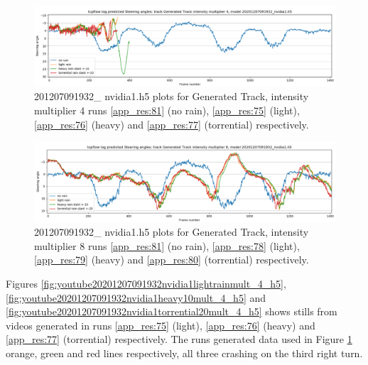 \begin{figure}[h!]
 \centering 
 \includegraphics[width=\textwidth]{Figures/sa_GeneratedTrackintensitymultiplier4_20201207091932_nvidia1.h5.png}
 \caption{201207091932\_ nvidia1.h5 plots for Generated Track, intensity multiplier 4 runs \ref{app_res:81} (no rain),  \ref{app_res:75} (light), \ref{app_res:76} (heavy) and \ref{app_res:77} (torrential) respectively.}
 \label{fig:sa_GeneratedTrackintensitymultiplier4_20201207091932_nvidia1} 
\end{figure}

\begin{figure}[h!]
 \centering 
 \includegraphics[width=\textwidth]{Figures/sa_GeneratedTrackintensitymultiplier8_20201207091932_nvidia1.h5.png}
 \caption{201207091932\_ nvidia1.h5 plots for Generated Track, intensity multiplier 8 runs \ref{app_res:81} (no rain),  \ref{app_res:78} (light), \ref{app_res:79} (heavy) and \ref{app_res:80} (torrential) respectively.}
 \label{fig:sa_GeneratedTrackintensitymultiplier8_20201207091932_nvidia1} 
\end{figure}


Figures \ref{fig:youtube20201207091932nvidia1lightrainmult_4_h5}, \ref{fig:youtube20201207091932nvidia1heavy10mult_4_h5} and  \ref{fig:youtube20201207091932nvidia1torrential20mult_4_h5} shows stills from videos generated in runs \ref{app_res:75} (light), \ref{app_res:76} (heavy) and \ref{app_res:77} (torrential) respectively. The runs generated data used in Figure \ref{fig:sa_GeneratedTrackintensitymultiplier4_20201207091932_nvidia1} orange, green and red lines respectively, all three crashing on the third right turn.

